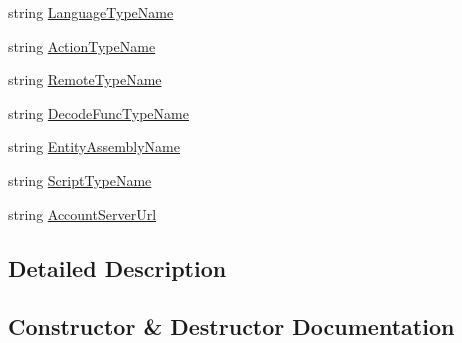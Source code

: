 \begin{DoxyCompactItemize}
\item 
string \mbox{\hyperlink{class_t_net_1_1_config_1_1_app_server_section_a9f3e3df4c48eac59d9fc294efa32e126}{Language\+Type\+Name}}
\item 
string \mbox{\hyperlink{class_t_net_1_1_config_1_1_app_server_section_a0cbeb3857acf533dfa0059572a5768d7}{Action\+Type\+Name}}
\item 
string \mbox{\hyperlink{class_t_net_1_1_config_1_1_app_server_section_a6a0a784a41141be35ad651059b1e508a}{Remote\+Type\+Name}}
\item 
string \mbox{\hyperlink{class_t_net_1_1_config_1_1_app_server_section_adf44cdd0600c0505cb240a44b791366c}{Decode\+Func\+Type\+Name}}
\item 
string \mbox{\hyperlink{class_t_net_1_1_config_1_1_app_server_section_ad2e262ccd6a616bdb751a35fcd881039}{Entity\+Assembly\+Name}}
\item 
string \mbox{\hyperlink{class_t_net_1_1_config_1_1_app_server_section_a4a0cad75de589f50d913672717c20dd9}{Script\+Type\+Name}}
\item 
string \mbox{\hyperlink{class_t_net_1_1_config_1_1_app_server_section_a2148a4de3b9a158362490a8b7ccc382f}{Account\+Server\+Url}}
\end{DoxyCompactItemize}


\subsection{Detailed Description}




\subsection{Constructor \& Destructor Documentation}
\mbox{\label{class_t_net_1_1_config_1_1_app_server_section_aae29de60385fe9cfa193dd017eac5679}} 
